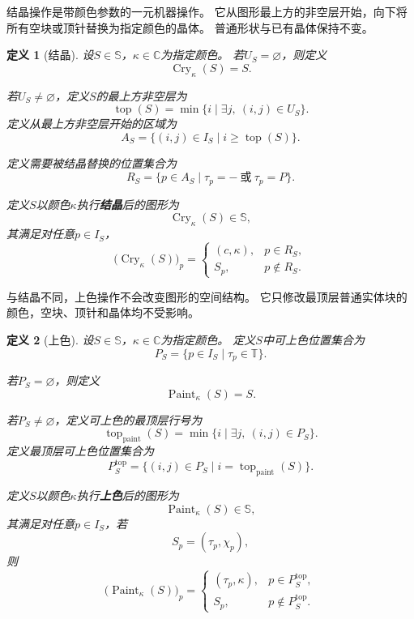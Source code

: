 \documentclass[UTF8,fontset=none]{ctexart}
\theoremstyle{cnthm}
\newtheorem{definition}{定义}[section]
\begin{document}
			结晶操作是带颜色参数的一元机器操作。
			它从图形最上方的非空层开始，向下将所有空块或顶针替换为指定颜色的晶体。
			普通形状与已有晶体保持不变。
			
			\begin{definition}[结晶]
				设$S\in\mathbb{S}$，$\kappa\in\mathbb{C}$为指定颜色。
				若$U_S=\varnothing$，则定义
				$$
				\operatorname{Cry}_{\kappa}(S)=S.
				$$
				
				若$U_S\neq\varnothing$，定义$S$的最上方非空层为
				$$
				\operatorname{top}(S)
				=
				\min\{i\mid \exists j,\ (i,j)\in U_S\}.
				$$
				定义从最上方非空层开始的区域为
				$$
				A_S
				=
				\{(i,j)\in I_S\mid i\geq \operatorname{top}(S)\}.
				$$
				
				定义需要被结晶替换的位置集合为
				$$
				R_S
				=
				\{p\in A_S\mid \tau_p=-\ \text{或}\ \tau_p=P\}.
				$$
				
				定义$S$以颜色$\kappa$执行\textbf{结晶}后的图形为
				$$
				\operatorname{Cry}_{\kappa}(S)\in\mathbb{S},
				$$
				其满足对任意$p\in I_S$，
				$$
				\bigl(\operatorname{Cry}_{\kappa}(S)\bigr)_p
				=
				\begin{cases}
					(c,\kappa), & p\in R_S,\\
					S_p, & p\notin R_S.
				\end{cases}
				$$
			\end{definition}
			
			与结晶不同，上色操作不会改变图形的空间结构。
			它只修改最顶层普通实体块的颜色，空块、顶针和晶体均不受影响。
			
			\begin{definition}[上色]
				设$S\in\mathbb{S}$，$\kappa\in\mathbb{C}$为指定颜色。
				定义$S$中可上色位置集合为
				$$
				P_S
				=
				\{p\in I_S\mid \tau_p\in\mathbb{T}\}.
				$$
				
				若$P_S=\varnothing$，则定义
				$$
				\operatorname{Paint}_{\kappa}(S)=S.
				$$
				
				若$P_S\neq\varnothing$，定义可上色的最顶层行号为
				$$
				\operatorname{top}_{\mathrm{paint}}(S)
				=
				\min\{i\mid \exists j,\ (i,j)\in P_S\}.
				$$
				定义最顶层可上色位置集合为
				$$
				P_S^{\mathrm{top}}
				=
				\{(i,j)\in P_S\mid i=\operatorname{top}_{\mathrm{paint}}(S)\}.
				$$
				
				定义$S$以颜色$\kappa$执行\textbf{上色}后的图形为
				$$
				\operatorname{Paint}_{\kappa}(S)\in\mathbb{S},
				$$
				其满足对任意$p\in I_S$，若
				$$
				S_p=(\tau_p,\chi_p),
				$$
				则
				$$
				\bigl(\operatorname{Paint}_{\kappa}(S)\bigr)_p
				=
				\begin{cases}
					(\tau_p,\kappa), & p\in P_S^{\mathrm{top}},\\
					S_p, & p\notin P_S^{\mathrm{top}}.
				\end{cases}
				$$
			\end{definition}
			
\end{document}
